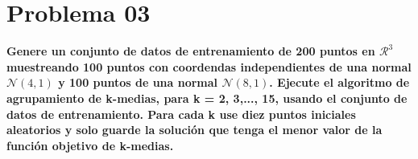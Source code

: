 \section*{Problema 03}

\textbf{Genere un conjunto de datos de entrenamiento de 200 puntos en $\mathcal{R}^3$ muestreando 100 puntos con coordendas independientes de una normal $\mathcal{N}(4,1)$ y 100 puntos de una normal $\mathcal{N}(8,1)$. Ejecute el algoritmo de agrupamiento de k-medias, para k = 2, 3,..., 15, usando el conjunto de datos de entrenamiento. Para cada k use diez puntos iniciales aleatorios y solo guarde la solución que tenga el menor valor de la función objetivo de k-medias.}





